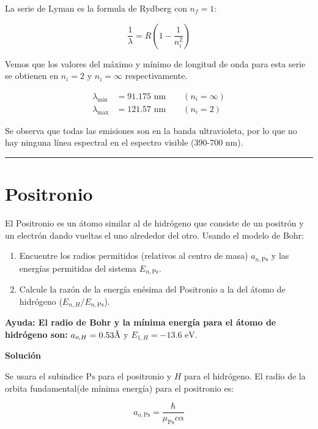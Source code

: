 \documentclass[12pt]{article}
\newcommand{\angstrom}{\mbox{\normalfont\AA}}
\begin{document}
La serie de Lyman es la formula de Rydberg con $n_f = 1$:

\begin{equation*}
\frac{1}{\lambda} = R\left(1-\frac{1}{n_i^2}\right)
\end{equation*}

Vemos que los valores del máximo y mínimo de longitud de onda para esta serie se obtienen en $n_i =2$ y $n_i = \infty$
respectivamente.

\begin{align*}
\lambda_{\text{min}} &= 91.175 \text{ nm} \qquad (n_i= \infty)\\
\lambda_{\text{max}} &= 121.57 \text{ nm} \qquad (n_i= 2)	
\end{align*}

Se observa que todas las emisiones son en la banda ultravioleta, por lo que no hay ninguna línea espectral en el
espectro visible (390-700 nm).\\
\noindent\rule{16.5cm}{0.4pt}



\section{Positronio}

El Positronio es un átomo similar al de hidrógeno que consiste de un positrón y un electrón dando vueltas el uno
alrededor del otro. Usando el modelo de Bohr:

\begin{enumerate}
	\item Encuentre los radios permitidos (relativos al centro de masa) $a_{n,\text{Ps}}$ y las
	energías permitidas del sistema $E_{n,\text{Ps}}$.
	\item Calcule la razón de la energía enésima del Positronio a la del átomo de hidrógeno ($E_{n,H}/E_{n,\text{Ps}}$).
\end{enumerate}

\textbf{Ayuda: El radio de Bohr y la mínima energía  para el átomo de hidrógeno son:} $a_{o,H} = 0.53 \angstrom$ y  $E_{1,H} = -13.6 \text{ eV}$.


\begin{center}
	\textbf{Solución}
\end{center}

Se usara el subindice $\text{Ps}$ para el positronio y $H$ para el hidrógeno. El radio de la orbita fundamental(de mínima energía) para el positronio es:

\begin{equation}
a_{o,\text{Ps}} = \frac{\hbar}{\mu_{\text{Ps}} c \alpha}
\end{equation}
\end{document}
